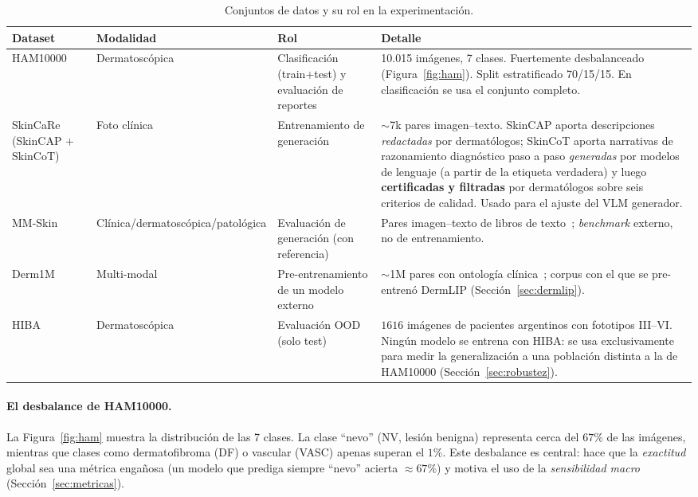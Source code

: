 \documentclass[11pt, a4paper]{article}
\begin{document}
\begin{table}[H]
  \centering
  \caption{Conjuntos de datos y su rol en la experimentación.}
  \label{tab:datasets}
  \small
  \begin{tabular}{p{2.8cm}p{3cm}p{2.4cm}p{6.1cm}}
    \toprule
    \textbf{Dataset} & \textbf{Modalidad} & \textbf{Rol} & \textbf{Detalle} \\
    \midrule
    HAM10000~\cite{tschandl2018ham10000} & Dermatoscópica & Clasificación (train+test) y evaluación de reportes &
    10.015 imágenes, 7 clases. Fuertemente desbalanceado (Figura~\ref{fig:ham}). Split estratificado
    70/15/15. En clasificación se usa el conjunto completo. \\
    \addlinespace
    SkinCaRe (SkinCAP $+$ SkinCoT)~\cite{shen2025skincare} & Foto clínica & Entrenamiento de generación &
    $\sim$7k pares imagen--texto. SkinCAP aporta descripciones \emph{redactadas} por dermatólogos;
    SkinCoT aporta narrativas de razonamiento diagnóstico paso a paso \emph{generadas} por modelos de
    lenguaje (a partir de la etiqueta verdadera) y luego \textbf{certificadas y filtradas} por
    dermatólogos sobre seis criterios de calidad. Usado para el ajuste del VLM generador. \\
    \addlinespace
    MM-Skin & Clínica/derma\-toscópica/patológica & Evaluación de generación (con referencia) &
    Pares imagen--texto de libros de texto~\cite{zeng2025mmskin}; \emph{benchmark} externo, no de
    entrenamiento. \\
    \addlinespace
    Derm1M & Multi-modal & Pre-entrenamiento de un modelo externo &
    $\sim$1M pares con ontología clínica~\cite{yan2025derm1m}; corpus con el que se pre-entrenó DermLIP
    (Sección~\ref{sec:dermlip}). \\
    \addlinespace
    HIBA~\cite{riccilara2023hiba} & Dermatoscópica & Evaluación OOD (solo test) &
    $1616$ imágenes de pacientes argentinos con fototipos III--VI. Ningún modelo se entrena con HIBA:
    se usa exclusivamente para medir la generalización a una población distinta a la de HAM10000
    (Sección~\ref{sec:robustez}). \\
    \bottomrule
  \end{tabular}
\end{table}

\paragraph{El desbalance de HAM10000.} La Figura~\ref{fig:ham} muestra la distribución de las 7 clases.
La clase ``nevo'' (NV, lesión benigna) representa cerca del $67\%$ de las imágenes, mientras que clases
como dermatofibroma (DF) o vascular (VASC) apenas superan el $1\%$. Este desbalance es central: hace que
la \emph{exactitud} global sea una métrica engañosa (un modelo que prediga siempre ``nevo'' acierta
$\approx 67\%$) y motiva el uso de la \emph{sensibilidad macro} (Sección~\ref{sec:metricas}).
\end{document}
